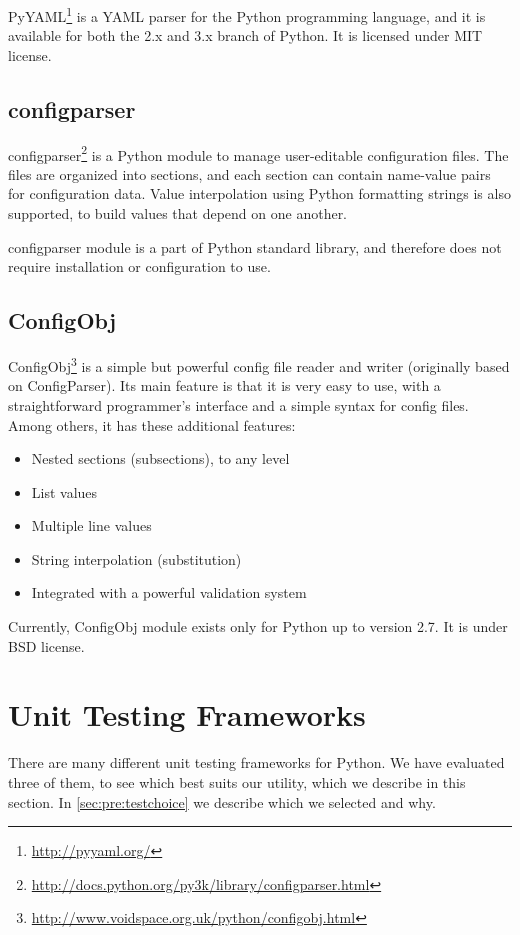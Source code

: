 PyYAML\footnote{\url{http://pyyaml.org/}} is a YAML parser for the Python
programming language, and it is available for both the 2.x and 3.x branch of
Python. It is licensed under MIT license.

\subsection{configparser}
configparser\footnote{\url{http://docs.python.org/py3k/library/configparser.html}}
is a Python module to manage user-editable configuration files. The
files are organized into sections, and each section can contain name-value
pairs for configuration data. Value interpolation using Python formatting
strings is also supported, to build values that depend on one another.

configparser module is a part of Python standard library, and therefore does
not require installation or configuration to use.

\subsection{ConfigObj}
ConfigObj\footnote{\url{http://www.voidspace.org.uk/python/configobj.html}} is
a simple but powerful config file reader and writer (originally based on
ConfigParser). Its main feature is that it is very easy to use, with a
straightforward programmer's interface and a simple syntax for config files.
Among others, it has these additional features:
\begin{itemize}
	\item Nested sections (subsections), to any level
	\item List values
	\item Multiple line values
	\item String interpolation (substitution)
	\item Integrated with a powerful validation system
\end{itemize}

\noindent Currently, ConfigObj module exists only for Python up to version
2.7. It is under BSD license.


\section{Unit Testing Frameworks}
\label{sec:pre:testing}
There are many different unit testing frameworks for Python. We have evaluated
three of them, to see which best suits our utility, which we describe in this
section. In \autoref{sec:pre:testchoice} we describe which we selected and why.

